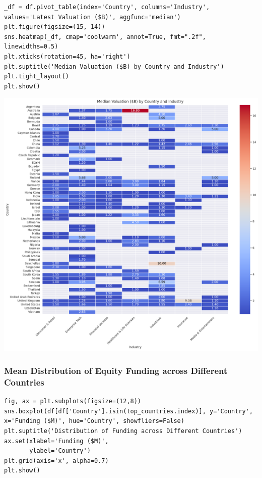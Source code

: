 \documentclass[a4paper,12pt]{article}
\begin{document}
\begin{verbatim}
_df = df.pivot_table(index='Country', columns='Industry', values='Latest Valuation ($B)', aggfunc='median')
plt.figure(figsize=(15, 14))
sns.heatmap(_df, cmap='coolwarm', annot=True, fmt=".2f", linewidths=0.5)
plt.xticks(rotation=45, ha='right')
plt.suptitle('Median Valuation ($B) by Country and Industry')
plt.tight_layout()
plt.show()
\end{verbatim}

\begin{center}
\includegraphics[width=.9\linewidth]{./.ob-jupyter/8191e29d90b7253a853630fc7935bf3868045f13.png}
\label{}
\end{center}
\subsubsection{Mean Distribution of Equity Funding across Different Countries}
\label{sec:org3c72c2f}
\begin{verbatim}
fig, ax = plt.subplots(figsize=(12,8))
sns.boxplot(df[df['Country'].isin(top_countries.index)], y='Country', x='Funding ($M)', hue='Country', showfliers=False)
plt.suptitle('Distribution of Funding across Different Countries')
ax.set(xlabel='Funding ($M)',
       ylabel='Country')
plt.grid(axis='x', alpha=0.7)
plt.show()
\end{verbatim}
\end{document}
